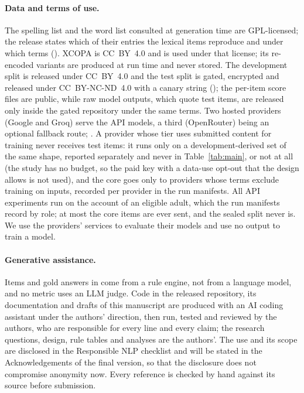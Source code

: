 \paragraph{Data and terms of use.}
The spelling list and the word list consulted at generation time are GPL-licensed; the release states which of their entries the lexical items reproduce and under which terms (). XCOPA is CC~BY~4.0 and is used under that license; its re-encoded variants are produced at run time and never stored. The development split is released under CC~BY~4.0 and the test split is gated, encrypted and released under CC~BY-NC-ND~4.0 with a canary string (); the per-item score files are public, while raw model outputs, which quote test items, are released only inside the gated repository under the same terms. Two hosted providers (Google and Groq) serve the  API models, a third (OpenRouter) being an optional fallback route; . A provider whose tier uses submitted content for training never receives test items: it runs only on a development-derived set of the same shape, reported separately and never in Table~\ref{tab:main}, or not at all (the study has no budget, so the paid key with a data-use opt-out that the design allows is not used), and the core goes only to providers whose terms exclude training on inputs, recorded per provider in the run manifests. All API experiments run on the account of an eligible adult, which the run manifests record by role; at most the core items are ever sent, and the sealed split never is. We use the providers' services to evaluate their models and use no output to train a model.

\paragraph{Generative assistance.}
Items and gold answers in \noilai{} come from a rule engine, not from a language model, and no metric uses an LLM judge. Code in the released repository, its documentation and drafts of this manuscript are produced with an AI coding assistant under the authors' direction, then run, tested and reviewed by the authors, who are responsible for every line and every claim; the research questions, design, rule tables and analyses are the authors'. The use and its scope are disclosed in the Responsible NLP checklist and will be stated in the Acknowledgements of the final version, so that the disclosure does not compromise anonymity now. Every reference is checked by hand against its source before submission.

